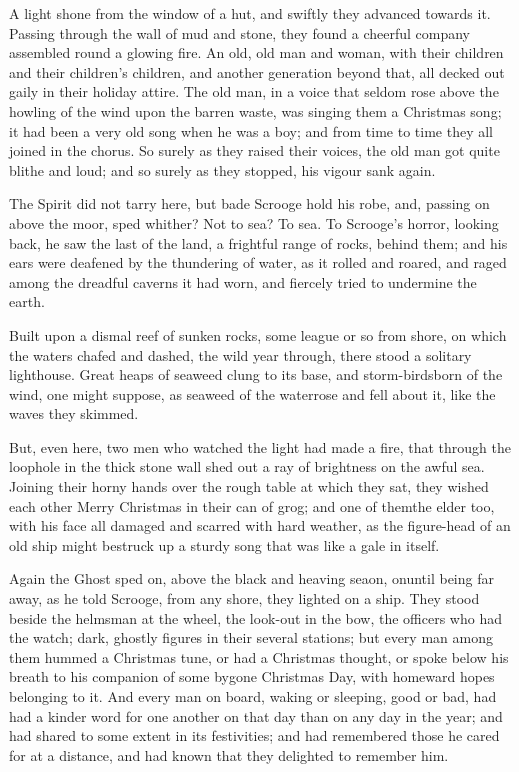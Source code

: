 \documentclass[paper=5.5in:8.5in,BCOR=5mm,twoside,DIV=calc,12pt,usegeometry]{scrbook} %
\begin{document}
A light shone from the window of a hut, and swiftly they advanced towards it. Passing through the wall of mud and stone, they found a cheerful company assembled round a glowing fire. An old, old man and woman, with their children and their children's children, and another generation beyond that, all decked out gaily in their holiday attire. The old man, in a voice that seldom rose above the howling of the wind upon the barren waste, was singing them a Christmas song; it had been a very old song when he was a boy; and from time to time they all joined in the chorus. So surely as they raised their voices, the old man got quite blithe and loud; and so surely as they stopped, his vigour sank again.

The Spirit did not tarry here, but bade Scrooge hold his robe, and, passing on above the moor, sped whither? Not to sea? To sea. To Scrooge's horror, looking back, he saw the last of the land, a frightful range of rocks, behind them; and his ears were deafened by the thundering of water, as it rolled and roared, and raged among the dreadful caverns it had worn, and fiercely tried to undermine the earth.

Built upon a dismal reef of sunken rocks, some league or so from shore, on which the waters chafed and dashed, the wild year through, there stood a solitary lighthouse. Great heaps of seaweed clung to its base, and storm-birds\textemdash born of the wind, one might suppose, as seaweed of the water\textemdash rose and fell about it, like the waves they skimmed.

But, even here, two men who watched the light had made a fire, that through the loophole in the thick stone wall shed out a ray of brightness on the awful sea. Joining their horny hands over the rough table at which they sat, they wished each other Merry Christmas in their can of grog; and one of them\textemdash the elder too, with his face all damaged and scarred with hard weather, as the figure-head of an old ship might be\textemdash struck up a sturdy song that was like a gale in itself.

Again the Ghost sped on, above the black and heaving sea\textemdash on, on\textemdash until being far away, as he told Scrooge, from any shore, they lighted on a ship. They stood beside the helmsman at the wheel, the look-out in the bow, the officers who had the watch; dark, ghostly figures in their several stations; but every man among them hummed a Christmas tune, or had a Christmas thought, or spoke below his breath to his companion of some bygone Christmas Day, with homeward hopes belonging to it. And every man on board, waking or sleeping, good or bad, had had a kinder word for one another on that day than on any day in the year; and had shared to some extent in its festivities; and had remembered those he cared for at a distance, and had known that they delighted to remember him.
\end{document}
